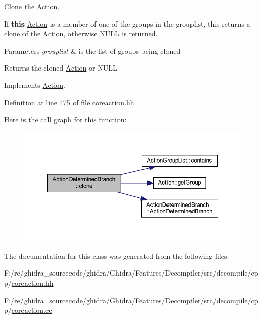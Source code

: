 Clone the \mbox{\hyperlink{class_action}{Action}}. 

If {\bfseries{this}} \mbox{\hyperlink{class_action}{Action}} is a member of one of the groups in the grouplist, this returns a clone of the \mbox{\hyperlink{class_action}{Action}}, otherwise N\+U\+LL is returned. 
\begin{DoxyParams}{Parameters}
{\em grouplist} & is the list of groups being cloned \\
\hline
\end{DoxyParams}
\begin{DoxyReturn}{Returns}
the cloned \mbox{\hyperlink{class_action}{Action}} or N\+U\+LL 
\end{DoxyReturn}


Implements \mbox{\hyperlink{class_action_af8242e41d09e5df52f97df9e65cc626f}{Action}}.



Definition at line 475 of file coreaction.\+hh.

Here is the call graph for this function\+:
\nopagebreak
\begin{figure}[H]
\begin{center}
\leavevmode
\includegraphics[width=350pt]{class_action_determined_branch_a41b8b77cfb5f57c0639009ead3c25ee9_cgraph}
\end{center}
\end{figure}


The documentation for this class was generated from the following files\+:\begin{DoxyCompactItemize}
\item 
F\+:/re/ghidra\+\_\+sourcecode/ghidra/\+Ghidra/\+Features/\+Decompiler/src/decompile/cpp/\mbox{\hyperlink{coreaction_8hh}{coreaction.\+hh}}\item 
F\+:/re/ghidra\+\_\+sourcecode/ghidra/\+Ghidra/\+Features/\+Decompiler/src/decompile/cpp/\mbox{\hyperlink{coreaction_8cc}{coreaction.\+cc}}\end{DoxyCompactItemize}
